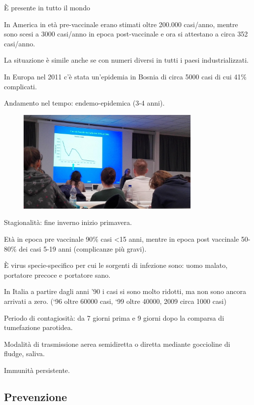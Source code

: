È presente in tutto il mondo

In America in età pre-vaccinale erano stimati oltre 200.000 casi/anno,
mentre sono scesi a 3000 casi/anno in epoca post-vaccinale e ora si
attestano a circa 352 casi/anno.

La situazione è simile anche se con numeri diversi in tutti i paesi
industrializzati.

In Europa nel 2011 c'è stata un'epidemia in Bosnia di circa 5000 casi di
cui 41\% complicati.

Andamento nel tempo: endemo-epidemica (3-4 anni).

\begin{figure}[!ht]
\centering
	\includegraphics[width=0.8\textwidth]{07/image3.jpeg}
	\end{figure}

Stagionalità:
fine inverno inizio primavera.

Età in epoca pre vaccinale 90\% casi <15 anni, mentre in epoca
post vaccinale 50-80\% dei casi 5-19 anni (complicanze più gravi).

È virus specie-specifico per cui le sorgenti di infezione sono: uomo
malato, portatore precoce e portatore sano.

In Italia a partire dagli anni '90 i casi si sono molto ridotti, ma non
sono ancora arrivati a zero. (`96 oltre 60000 casi, `99 oltre 40000,
2009 circa 1000 casi)

Periodo di contagiosità: da 7 giorni prima e 9 giorni dopo la comparsa
di tumefazione parotidea.

Modalità di trasmissione aerea semidiretta o diretta mediante goccioline
di fludge, saliva.

Immunità persistente.

\subsection{Prevenzione}

